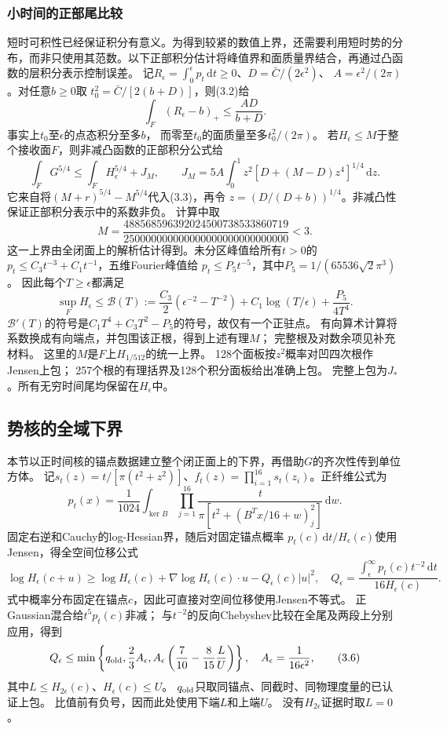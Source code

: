 \documentclass[UTF8,fontset=fandol,zihao=-4,a4paper]{ctexart}
\newcommand{\1}{\mathbf 1}
\newcommand{\dd}{\,\mathrm d}
\begin{document}
\subsubsection{小时间的正部尾比较}
短时可积性已经保证积分有意义。为得到较紧的数值上界，还需要利用短时势的分布，而非只使用其范数。以下正部积分估计将峰值界和面质量界结合，再通过凸函数的层积分表示控制误差。
记$R_\epsilon=\int_0^\epsilon p_t\dd t\ge0$、$D=\bar C/(2\epsilon^2)$、
$A=\epsilon^2/(2\pi)$。对任意$b\ge0$取
$t_0^2=\bar C/[2(b+D)]$，则(3.2)给
\[
 \int_F(R_\epsilon-b)_+\le\frac{AD}{b+D}.                 \tag{3.3}
\]
事实上$t_0$至$\epsilon$的点态积分至多$b$，
而零至$t_0$的面质量至多$t_0^2/(2\pi)$。
若$H_\epsilon\le M$于整个接收面$F$，则非减凸函数的正部积分公式给
\[
 \int_FG^{5/4}\le\int_FH_\epsilon^{5/4}+J_M,\qquad
 J_M=5A\int_0^1 z^2[D+(M-D)z^4]^{1/4}\dd z.             \tag{3.4}
\]
它来自将$(M+r)^{5/4}-M^{5/4}$代入(3.3)，再令
$z=(D/(D+b))^{1/4}$。非减凸性保证正部积分表示中的系数非负。
计算中取
\[
 M=\frac{488568596392024500738533860719}{250000000000000000000000000000}<3.
\]
这一上界由全闭面上的解析估计得到。未分区峰值给所有$t>0$的
$p_t\le C_3t^{-3}+C_1t^{-1}$，五维Fourier峰值给
$p_t\le P_5t^{-5}$，其中$P_5=1/(65536\sqrt2\pi^3)$。
因此每个$T\ge\epsilon$都满足
\[
 \sup_F H_\epsilon\le\mathcal B(T):=
 \frac{C_3}{2}(\epsilon^{-2}-T^{-2})+
 C_1\log(T/\epsilon)+\frac{P_5}{4T^4}.
\]
$\mathcal B'(T)$的符号是$C_1T^4+C_3T^2-P_5$的符号，故仅有一个正驻点。
有向算术计算将系数换成有向端点，并包围该正根，得到上述有理$M$；
完整根及对数余项见补充材料。
这里的$M$是$F$上$H_{1/512}$的统一上界。
128个面板按$z^2$概率对凹四次根作Jensen上包；
257个根的有理括界及128个积分面板给出准确上包。
完整上包为$J_*$。所有无穷时间尾均保留在$H_\epsilon$中。

\subsection{势核的全域下界}
本节以正时间核的锚点数据建立整个闭正面上的下界，再借助$G$的齐次性传到单位方体。
记$s_t(z)=t/[\pi(t^2+z^2)]$、$f_t(z)=\prod_{i=1}^{16}s_t(z_i)$。正纤维公式为
\[
 p_t(x)=\frac1{1024}\int_{\ker B}
 \prod_{j=1}^{16}\frac{t}{\pi[t^2+(B^Tx/16+w)_j^2]}\dd w.
\]
固定右逆和Cauchy的log-Hessian界，随后对固定锚点概率
$p_t(c)\dd t/H_\epsilon(c)$使用Jensen，得全空间位移公式
\[
 \log H_\epsilon(c+u)\ge\log H_\epsilon(c)
 +\nabla\log H_\epsilon(c)\cdot u-Q_\epsilon(c)|u|^2,\quad
 Q_\epsilon=\frac{\int_\epsilon^\infty p_t(c)t^{-2}\dd t}{16H_\epsilon(c)}.
 \tag{3.5}
\]
式中概率分布固定在锚点$c$，因此可直接对空间位移使用Jensen不等式。
正Gaussian混合给$t^5p_t(c)$非减；
与$t^{-2}$的反向Chebyshev比较在全尾及两段上分别应用，得到
\[
 Q_\epsilon\le\min\left\{q_{\rm old},\frac23A_\epsilon,
 A_\epsilon\left(\frac7{10}-\frac8{15}\frac{L}{U}\right)\right\},
 \quad A_\epsilon=\frac1{16\epsilon^2},                 \tag{3.6}
\]
其中$L\le H_{2\epsilon}(c)$、$H_\epsilon(c)\le U$。
$q_{\rm old}$只取同锚点、同截时、同物理度量的已认证上包。
比值前有负号，因而此处使用下端$L$和上端$U$。
没有$H_{2\epsilon}$证据时取$L=0$。
\end{document}
